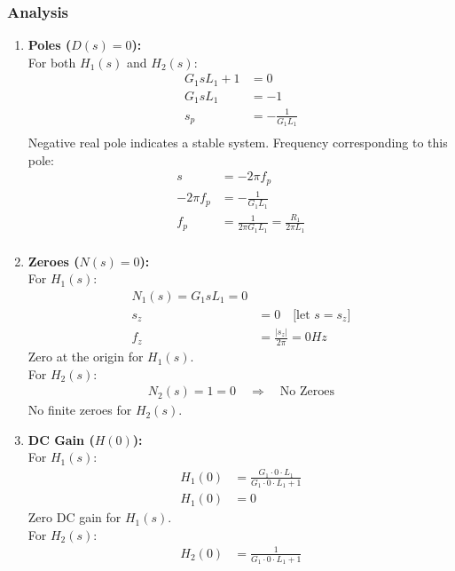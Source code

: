 \subsubsection{Analysis}
\begin{enumerate}
    \item \textbf{Poles (\(D(s) = 0\)):} \\
      For both \(H_1(s)\) and \(H_2(s)\):
      \begin{align*}
        G_1 s L_1 + 1 &= 0 \\
        G_1 s L_1 &= -1 \\
        s_p &= -\frac{1}{G_1 L_1} \\
      \end{align*}
      Negative real pole indicates a stable system. Frequency
      corresponding to this pole:
      \begin{align*}
        s &= -2 \pi f_p \\
        -2 \pi f_p &= -\frac{1}{G_1 L_1} \\
        f_p &= \frac{1}{2 \pi G_1 L_1} = \frac{R_1}{2 \pi L_1} \\
      \end{align*}
    \item \textbf{Zeroes (\(N(s) = 0\)):} \\
      For \(H_1(s)\):
      \begin{align*}
          N_1(s) = G_1 s L_1 = 0 \\
          s_z &= 0 \quad \text{[let \(s = s_z\)]} \\
          f_z &= \frac{|s_z|}{2\pi} = 0 Hz
      \end{align*}
      Zero at the origin for \(H_1(s)\). \\
      For \(H_2(s)\):
      \begin{align*}
        N_2(s) = 1 = 0 \quad\Rightarrow\quad \text{No Zeroes}
      \end{align*}
      No finite zeroes for \(H_2(s)\).
    \item \textbf{DC Gain (\(H(0)\)):} \\
      For \(H_1(s)\):
        \begin{align*}
          H_1(0) &= \frac{G_1 \cdot 0 \cdot L_1}{G_1 \cdot 0 \cdot L_1 + 1} \\
          H_1(0) &= 0
        \end{align*}
      Zero DC gain for \(H_1(s)\). \\
      For \(H_2(s)\):
        \begin{align*}
          H_2(0) &= \frac{1}{G_1 \cdot 0 \cdot L_1 + 1} \\

\end{align*}
\end{enumerate}
